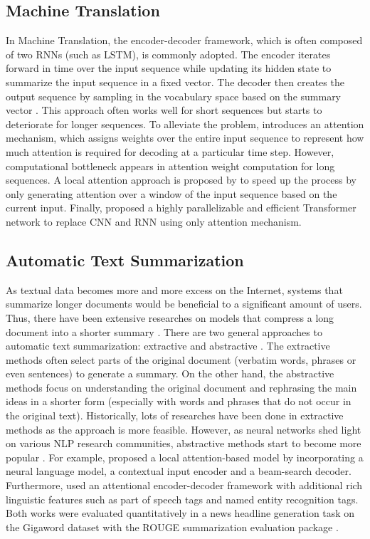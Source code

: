 \subsection{Machine Translation}
In Machine Translation, the encoder-decoder framework, which is often composed of two RNNs (such as LSTM), is commonly adopted. The encoder iterates forward in time over the input sequence while updating its hidden state to summarize the input sequence in a fixed vector. The decoder then creates the output sequence by sampling in the vocabulary space based on the summary vector \cite{sutskever2014sequence,cho2014learning}. This approach often works well for short sequences but starts to deteriorate for longer sequences. To alleviate the problem, \cite{bahdanau2014neural} introduces an attention mechanism, which assigns weights over the entire input sequence to represent how much attention is required for decoding at a particular time step. However, computational bottleneck appears in attention weight computation for long sequences. A local attention approach is proposed by \cite{luong2015effective} to speed up the process by only generating attention over a window of the input sequence based on the current input. Finally, \cite{vaswani2017attention} proposed a highly parallelizable and efficient Transformer network to replace CNN and RNN using only attention mechanism.

\subsection{Automatic Text Summarization}

As textual data becomes more and more excess on the Internet, systems that summarize longer documents would be beneficial to a significant amount of users. Thus, there have been extensive researches on models that compress a long document into a shorter summary \cite{gambhir2017recent}. There are two general approaches to automatic text summarization: extractive and abstractive \cite{gupta2010survey}. The extractive methods often select parts of the original document (verbatim words, phrases or even sentences) to generate a summary. On the other hand, the abstractive methods focus on understanding the original document and rephrasing the main ideas in a shorter form (especially with words and phrases that do not occur in the original text). Historically, lots of researches have been done in extractive methods as the approach is more feasible. However, as neural networks shed light on various NLP research communities, abstractive methods start to become more popular \cite{nallapati2016sequence, nallapati2016abstractive, rush2015neural}. For example, \cite{rush2015neural} proposed a local attention-based model by incorporating a neural language model, a contextual input encoder and a beam-search decoder. Furthermore, \cite{nallapati2016abstractive} used an attentional encoder-decoder framework with additional rich linguistic features such as part of speech tags and named entity recognition tags. Both works were evaluated quantitatively in a news headline generation task on the Gigaword dataset \cite{graff2003english} with the ROUGE summarization evaluation package \cite{lin2004rouge}. 